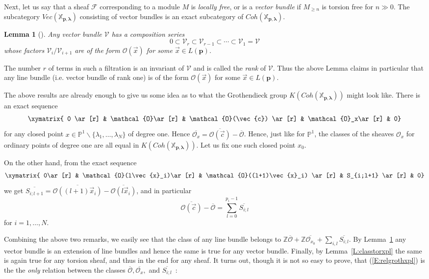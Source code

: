 \documentclass[a4paper,10pt]{amsart}
\def\Z{\mathbb{Z}}
\def\O{\mathcal{O}}
\def\p{\mathbf{p}}
\def\xpl{\mathbb{X}_{\mathbf{p},\boldsymbol{\lambda}}}
\newtheorem{lem}[theo]{Lemma}
\numberwithin{equation}{section}
\begin{document}
{Next, let us say that a sheaf $\mathcal{F}$ corresponding to a module $M$ is \textit{locally free}, or is a \textit{vector bundle} if $M_{\geq n}$ is torsion free for $n \gg 0$. The subcategory $Vec(\xpl)$ consisting of vector bundles is an exact subcategory of $Coh(\xpl)$.

\vspace{.1in}

\begin{lem}[\cite{GL}]\label{L:vbdecomp}Any vector bundle $\mathcal{V}$ has a composition series
$$0 \subset \mathcal{V}_r \subset \mathcal{V}_{r-1} \subset \cdots \subset \mathcal{V}_1=\mathcal{V}$$ whose factors $\mathcal{V}_i/\mathcal{V}_{i+1}$ are of the form $\O(\vec{x})$ for some $\vec{x} \in L(\p)$.
\end{lem}

\vspace{.1in}

The number $r$ of terms in such a filtration is an invariant of $\mathcal{V}$ and is called the \textit{rank} of $\mathcal{V}$. Thus the above Lemma claims in particular that any line bundle (i.e. vector bundle of rank one) is of the form $\O(\vec{x})$ for some $\vec{x} \in L(\p)$.

\vspace{.15in}

The above results are already enough to give us some idea as to what the Grothendieck group $K(Coh(\xpl))$ might look like. There is an exact sequence
$$\xymatrix{ 0 \ar[r] & \O \ar[r] & \O(\vec{c}) \ar[r] & \O_x\ar[r] & 0}$$
for any closed point $x \in \mathbb{P}^1\backslash \{\lambda_1, \ldots, \lambda_N\}$ of degree one. Hence $\overline{\O_x}=\overline{\O(\vec{c})}-\overline{\O}$. Hence, just like for $\mathbb{P}^1$, the classes of the sheaves $\O_x$ for ordinary points of degree one are all equal in $K(Coh(\xpl))$. Let us fix one such closed point $x_0$.

On the other hand, from the exact sequence
$$\xymatrix{ 0\ar[r] & \O(l\vec{x}_i)\ar[r] & \O((l+1)\vec{x}_i) \ar[r] & S_{i;l+1} \ar[r] & 0}$$
we get $\overline{S_{i;l+1}}=\overline{\O((l+1)\vec{x}_i)}-\overline{\O(l\vec{x}_i)}$, and in particular
\begin{equation}\label{E:relgrothxpl}
\overline{\O(\vec{c})}-\overline{\O}=\sum_{l=0}^{p_i-1} \overline{S_{i;l}}
\end{equation}
for $i=1, \ldots, N$.

Combining the above two remarks, we easily see that the class of any line bundle belongs to
$\Z \overline{\O} +\Z \overline{\O_{x_0}} +\sum_{i,l} \overline{S_{i;l}}.$
By Lemma~\ref{L:vbdecomp} any vector bundle is an extension of line bundles and hence the same is true for any vector bundle. Finally, by Lemma~\ref{L:classtorxpl} the same is again true for any torsion sheaf, and thus in the end for any sheaf. It turns out, though it is not so easy to prove, that (\ref{E:relgrothxpl}) is the the \textit{only} relation between the classes $\overline{\O},\overline{\O_x},$ and $\overline{S_{i;l}}$~:

}
\end{document}

